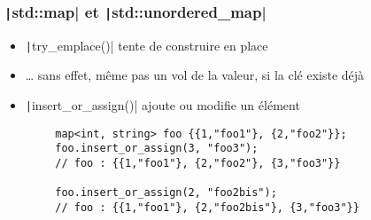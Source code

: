 \documentclass[C++.tex]{subfiles}
\begin{document}
\begin{frame}[fragile]
	\frametitle{\texttt|std::map| et \texttt|std::unordered_map|}
	\begin{itemize}
		\item \texttt|try_emplace()| tente de construire en place
		\item \ldots{} sans effet, même pas un \og vol\fg{} de la valeur, si la clé existe déjà
		\item \texttt|insert_or_assign()| ajoute ou modifie un élément
	\end{itemize}

	\begin{verbatim}
		map<int, string> foo {{1,"foo1"}, {2,"foo2"}};
		foo.insert_or_assign(3, "foo3");
		// foo : {{1,"foo1"}, {2,"foo2"}, {3,"foo3"}}

		foo.insert_or_assign(2, "foo2bis");
		// foo : {{1,"foo1"}, {2,"foo2bis"}, {3,"foo3"}}
	\end{verbatim}


\end{frame}
\end{document}
